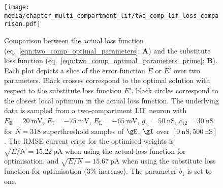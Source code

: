 \begin{figure}
	\centering
	\texttt{[image: media/chapter\_multi\_compartment\_lif/two\_comp\_lif\_loss\_comparison.pdf]}
	\caption[Comparison between the actual and substitute loss function.]{Comparison between the actual loss function (eq.~\ref{eqn:two_comp_optimal_parameters}; \textbf{A}) and the substitute loss function (eq.~\ref{eqn:two_comp_optimal_parameters_prime}; \textbf{B}).
	Each plot depicts a slice of the error function $E$ or $E'$ over two parameters.
	Black crosses correspond to the optimal solution with respect to the substitute loss function $E'$, black circles correspond to the closest local optimum in the actual loss function.
	The underlying data is sampled from a two-compartment LIF neuron with  $E_\mathrm{E} = \SI{20}{\milli\volt}$, $E_\mathrm{I} = \SI{-75}{\milli\volt}$, $E_\mathrm{L} = \SI{-65}{\milli\volt}$, $g_\mathrm{L} = \SI{50}{\nano\siemens}$, $c_{12} =\SI{30}{\nano\siemens}$ for $N = 318$ superthreshold samples of $\gE$, $\gI$ over $[\SI{0}{\nano\siemens}, \SI{500}{\nano\siemens}]$.
	The RMSE current error for the optimised weights is $\sqrt{E/N} = \SI{15.22}{\pico\ampere}$ when using the actual loss function for optimisation, and $\sqrt{E/N} = \SI{15.67}{\pico\ampere}$ when using the substitute loss function for optimisation ($3\%$ increase). The parameter $b_1$ is set to one.
	}
	\label{fig:two_comp_lif_loss_comparison}
\end{figure}

